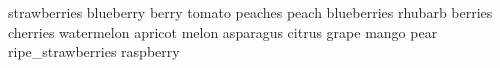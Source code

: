 strawberries blueberry berry tomato peaches peach blueberries rhubarb berries cherries watermelon apricot melon asparagus citrus grape mango pear ripe\_strawberries raspberry 
